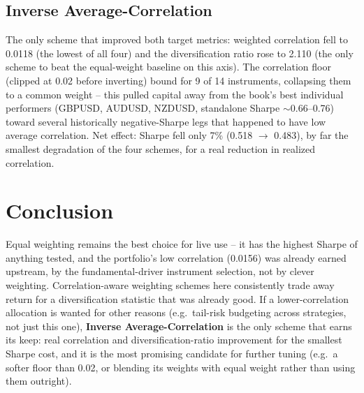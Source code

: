 \documentclass[11pt]{article}
\begin{document}
\subsection*{Inverse Average-Correlation}
The only scheme that improved both target metrics: weighted correlation fell to 0.0118 (the lowest of all four) and the diversification ratio rose to 2.110 (the only scheme to beat the equal-weight baseline on this axis). The correlation floor (clipped at 0.02 before inverting) bound for 9 of 14 instruments, collapsing them to a common weight -- this pulled capital away from the book's best individual performers (GBPUSD, AUDUSD, NZDUSD, standalone Sharpe $\sim$0.66--0.76) toward several historically negative-Sharpe legs that happened to have low average correlation. Net effect: Sharpe fell only 7\% (0.518 $\to$ 0.483), by far the smallest degradation of the four schemes, for a real reduction in realized correlation.

\section*{Conclusion}
Equal weighting remains the best choice for live use -- it has the highest Sharpe of anything tested, and the portfolio's low correlation (0.0156) was already earned upstream, by the fundamental-driver instrument selection, not by clever weighting. Correlation-aware weighting schemes here consistently trade away return for a diversification statistic that was already good. If a lower-correlation allocation is wanted for other reasons (e.g.\ tail-risk budgeting across strategies, not just this one), \textbf{Inverse Average-Correlation} is the only scheme that earns its keep: real correlation and diversification-ratio improvement for the smallest Sharpe cost, and it is the most promising candidate for further tuning (e.g.\ a softer floor than 0.02, or blending its weights with equal weight rather than using them outright).
\end{document}
